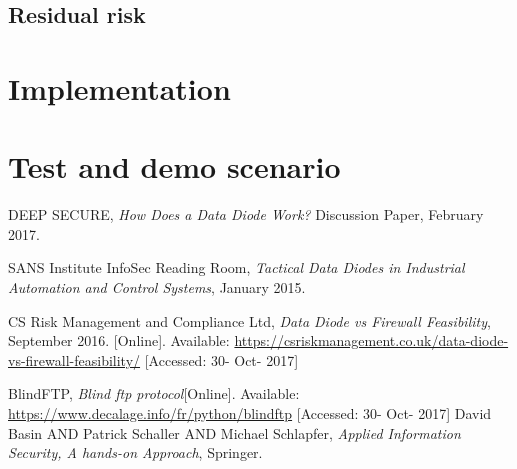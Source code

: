 \documentclass[a4paper,10pt]{article}
\begin{document}
\subsection{Residual risk}

\section{Implementation}

\section{Test and demo scenario}


\clearpage
\begin{thebibliography}{9}
DEEP SECURE,
\textit{How	Does a Data Diode Work?}
Discussion Paper, February 2017.

SANS Institute InfoSec Reading Room,
\textit{Tactical Data Diodes in Industrial Automation and Control Systems}, January 2015.

CS Risk Management and Compliance Ltd,
\textit{Data Diode vs Firewall Feasibility}, September 2016. [Online]. Available: \url{https://csriskmanagement.co.uk/data-diode-vs-firewall-feasibility/} [Accessed: 30- Oct- 2017]

BlindFTP,
\textit{Blind ftp protocol}[Online]. Available: \url{https://www.decalage.info/fr/python/blindftp} [Accessed: 30- Oct- 2017]
David Basin AND Patrick Schaller AND Michael Schlapfer,
\textit{Applied Information Security, A hands-on Approach},
Springer.
\end{thebibliography}
\end{document}
